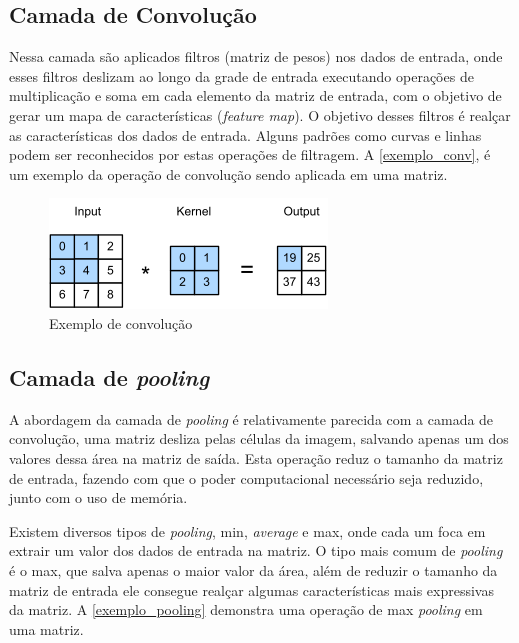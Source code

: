 \subsection{Camada de Convolução}\label{cap_conceitos_cnn_conv}
Nessa camada são aplicados filtros (matriz de pesos) nos dados de entrada, onde esses filtros deslizam ao longo da
grade de entrada executando operações de multiplicação e soma em cada elemento da matriz de entrada, com o objetivo de
gerar um mapa de características (\textit{feature map}).
O objetivo desses filtros é realçar as características dos dados de entrada. Alguns padrões como curvas e linhas podem ser
reconhecidos por estas operações de filtragem.
A \autoref{exemplo_conv}, é um exemplo da operação de convolução sendo aplicada em uma matriz.

\begin{figure}[htb]
	\begin{center}
		\includegraphics[scale=1.0]{Imagens/conv}
	\end{center}
	\caption {\label{exemplo_conv} Exemplo de convolução}
\end{figure}

\subsection{Camada de \textit{pooling}}\label{cap_conceitos_cnn_pooling}
A abordagem da camada de \textit{pooling} é relativamente parecida com a camada de convolução,
uma matriz desliza pelas células da imagem, salvando apenas um dos valores dessa área na matriz de saída.
Esta operação reduz o tamanho da matriz de entrada, fazendo com que o poder computacional necessário seja reduzido,
junto com o uso de memória.

Existem diversos tipos de \textit{pooling}, min, \textit{average} e max, onde cada um foca em extrair um valor dos
dados de entrada na matriz. O tipo mais comum de \textit{pooling} é o max, que salva apenas o maior valor da área,
além de reduzir o tamanho da matriz de entrada ele consegue realçar algumas características mais expressivas da matriz.
A \autoref{exemplo_pooling} demonstra uma operação de max \textit{pooling} em uma matriz.

